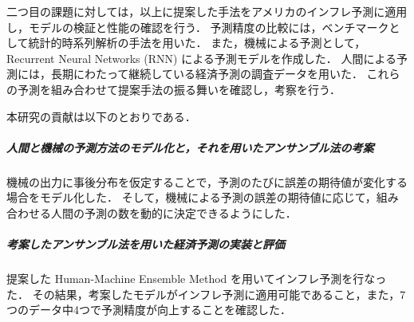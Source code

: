 \documentclass[../main.tex]{subfiles}
\begin{document}
\begin{jabstract}
二つ目の課題に対しては，以上に提案した手法をアメリカのインフレ予測に適用し，モデルの検証と性能の確認を行う．
予測精度の比較には，ベンチマークとして統計的時系列解析の手法を用いた．
また，機械による予測として，Recurrent Neural Networks (RNN) による予測モデルを作成した．
人間による予測には，長期にわたって継続している経済予測の調査データを用いた．
これらの予測を組み合わせて提案手法の振る舞いを確認し，考察を行う．

本研究の貢献は以下のとおりである．

\subparagraph{人間と機械の予測方法のモデル化と，それを用いたアンサンブル法の考案}
機械の出力に事後分布を仮定することで，予測のたびに誤差の期待値が変化する場合をモデル化した．
そして，機械による予測の誤差の期待値に応じて，組み合わせる人間の予測の数を動的に決定できるようにした．

\subparagraph{考案したアンサンブル法を用いた経済予測の実装と評価}
提案した Human-Machine Ensemble Method を用いてインフレ予測を行なった．
その結果，考案したモデルがインフレ予測に適用可能であること，また，7つのデータ中4つで予測精度が向上することを確認した．
\end{jabstract}
\end{document}
